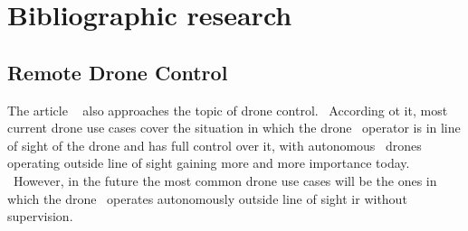 \chapter{Bibliographic research}
\label{ch:research}


\section{Remote Drone Control}
\label{sec:research-remote-drone-control}
The article ~\cite{ericsson1} also approaches the topic of drone control. \
According ot it, most current drone use cases cover the situation in which the drone \
operator is in line of sight of the drone and has full control over it, with autonomous \
drones operating outside line of sight gaining more and more importance today. \
However, in the future the most common drone use cases will be the ones in which the drone \
operates autonomously outside line of sight ir without supervision.

